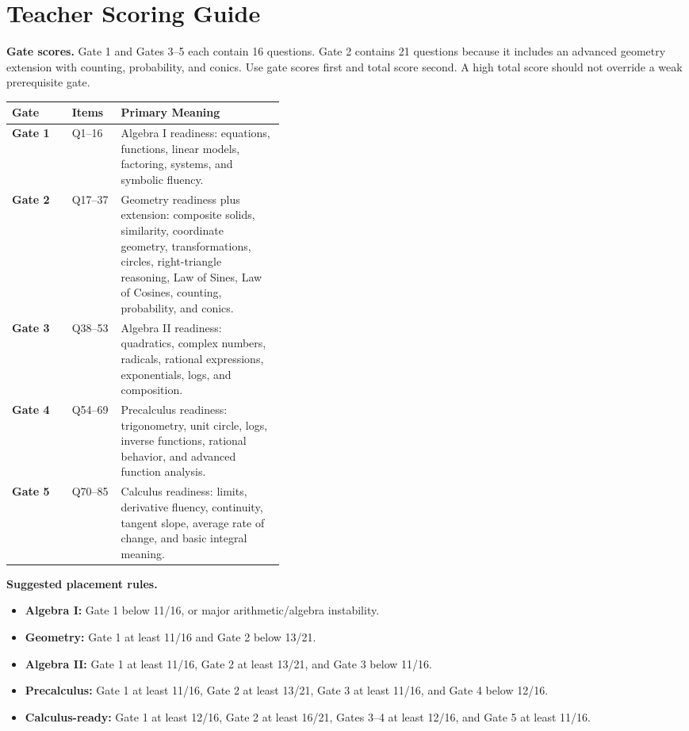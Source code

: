 \documentclass[11pt]{article}
\begin{document}
\newpage
\section*{Teacher Scoring Guide}

\begin{guidebox}
\textbf{Gate scores.} Gate 1 and Gates 3--5 each contain 16 questions. Gate 2 contains 21 questions because it includes an advanced geometry extension with counting, probability, and conics. Use gate scores first and total score second. A high total score should not override a weak prerequisite gate.
\end{guidebox}

\begin{center}
\begin{tabularx}{\linewidth}{>{\bfseries}p{0.22\linewidth}p{0.18\linewidth}X}
\toprule
Gate & Items & Primary Meaning\\
\midrule
Gate 1 & Q1--16 & Algebra I readiness: equations, functions, linear models, factoring, systems, and symbolic fluency.\\
Gate 2 & Q17--37 & Geometry readiness plus extension: composite solids, similarity, coordinate geometry, transformations, circles, right-triangle reasoning, Law of Sines, Law of Cosines, counting, probability, and conics.\\
Gate 3 & Q38--53 & Algebra II readiness: quadratics, complex numbers, radicals, rational expressions, exponentials, logs, and composition.\\
Gate 4 & Q54--69 & Precalculus readiness: trigonometry, unit circle, logs, inverse functions, rational behavior, and advanced function analysis.\\
Gate 5 & Q70--85 & Calculus readiness: limits, derivative fluency, continuity, tangent slope, average rate of change, and basic integral meaning.\\
\bottomrule
\end{tabularx}
\end{center}

\begin{titlebox}
\textbf{Suggested placement rules.}
\begin{itemize}[leftmargin=1.3em,itemsep=0.22em]
\item \textbf{Algebra I:} Gate 1 below 11/16, or major arithmetic/algebra instability.
\item \textbf{Geometry:} Gate 1 at least 11/16 and Gate 2 below 13/21.
\item \textbf{Algebra II:} Gate 1 at least 11/16, Gate 2 at least 13/21, and Gate 3 below 11/16.
\item \textbf{Precalculus:} Gate 1 at least 11/16, Gate 2 at least 13/21, Gate 3 at least 11/16, and Gate 4 below 12/16.
\item \textbf{Calculus-ready:} Gate 1 at least 12/16, Gate 2 at least 16/21, Gates 3--4 at least 12/16, and Gate 5 at least 11/16.
\end{itemize}
\end{titlebox}
\end{document}
